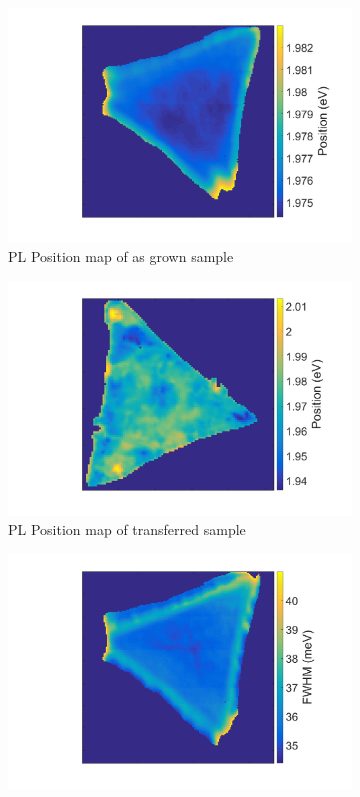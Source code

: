 \begin{figure}[ht]
\begin{center}
\begin{subfigure}[b]{0.4\textwidth}
			\includegraphics[scale=0.15]{Transfer/TransferPLPositionMapAsgrown.png}
			\caption{PL Position map of as grown sample}
			\label{fig:TransferPLPositionMapAsgrown}
		\end{subfigure}
		\quad
		\begin{subfigure}[b]{0.4\textwidth}
			\includegraphics[scale=0.15]{Transfer/TransferPLPositionMapTransferred.png}
			\caption{PL Position map of transferred sample}
			\label{fig:TransferPLPositionMapTransferred}
		\end{subfigure}
		\vfill
		\begin{subfigure}[b]{0.4\textwidth}
			\includegraphics[scale=0.15]{Transfer/TransferPLWidthMapAsgrown.png}

\end{subfigure}
\end{center}
\end{figure}
